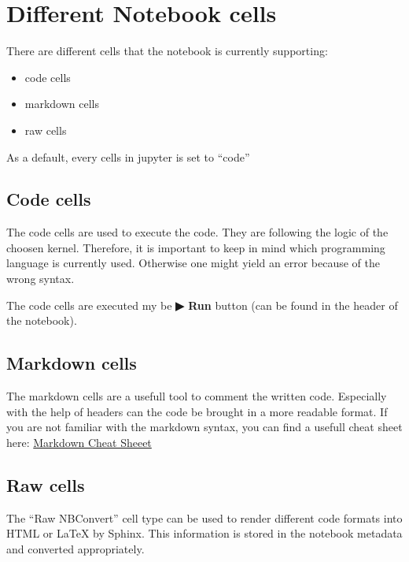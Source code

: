 \documentclass[
  letterpaper,
  DIV=11,
  numbers=noendperiod]{scrreprt}
\begin{document}
\hypertarget{different-notebook-cells}{%
\section{Different Notebook cells}\label{different-notebook-cells}}

There are different cells that the notebook is currently supporting:

\begin{itemize}
\item
  code cells
\item
  markdown cells
\item
  raw cells
\end{itemize}

As a default, every cells in jupyter is set to ``code''

\hypertarget{code-cells}{%
\subsection{Code cells}\label{code-cells}}

The code cells are used to execute the code. They are following the
logic of the choosen kernel. Therefore, it is important to keep in mind
which programming language is currently used. Otherwise one might yield
an error because of the wrong syntax.

The code cells are executed my be \textbf{▶ Run} button (can be found in
the header of the notebook).

\hypertarget{markdown-cells}{%
\subsection{Markdown cells}\label{markdown-cells}}

The markdown cells are a usefull tool to comment the written code.
Especially with the help of headers can the code be brought in a more
readable format. If you are not familiar with the markdown syntax, you
can find a usefull cheat sheet here:
\href{https://www.ibm.com/docs/en/db2-event-store/2.0.0?topic=notebooks-markdown-jupyter-cheatsheet}{Markdown
Cheat Sheeet}

\hypertarget{raw-cells}{%
\subsection{Raw cells}\label{raw-cells}}

The ``Raw NBConvert'' cell type can be used to render different code
formats into HTML or LaTeX by Sphinx. This information is stored in the
notebook metadata and converted appropriately.
\end{document}
